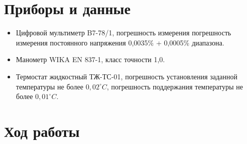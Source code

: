 \documentclass[a4paper,12pt]{article}
\begin{document}
\section{Приборы и данные}
\begin{itemize}
    \item Цифровой мультиметр B7-78/1, погрешность измерения погрешность измерения постоянного напряжения 0,0035\% + 0,0005\% диапазона. 
    \item Манометр WIKA EN 837-1, класс точности 1,0.
    \item Термостат жидкостный ТЖ-ТС-01,  погрешность установления заданной температуры не более $0,02 ^\circ C$, погрешность поддержания температуры не более $0,01 ^\circ C$.

\end{itemize}

\section{Ход работы}
\end{document}
